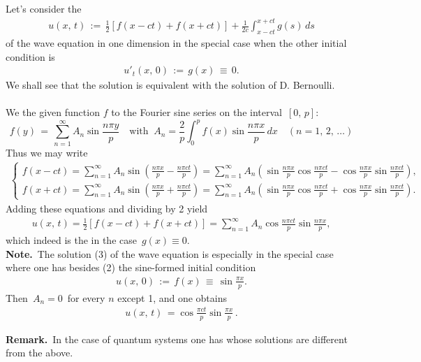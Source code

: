 \documentclass[12pt]{article}
\theoremstyle{definition}
\begin{document}
Let's consider the 
\begin{align}
u(x,\,t) \,:=\, \frac{1}{2}[f(x\!-\!ct)+f(x\!+\!ct)]+\frac{1}{2c}\int_{x-ct}^{x+ct}g(s)\,ds
\end{align}
of the wave equation in one dimension in the special case when the other initial condition is
\begin{align}
u'_t(x,\,0) \,:=\, g(x) \,\equiv\, 0.
\end{align}
We shall see that the solution is equivalent with the solution of D. Bernoulli.\\ \\

We  the given function $f$ to the Fourier sine series on the interval \,$[0,\,p]$:
$$
f(y) \,=\, \sum_{n=1}^\infty A_n\sin\frac{n\pi y}{p} \quad \mbox{with}\;\; 
A_n = \frac{2}{p}\int_0^pf(x)\sin\frac{n\pi x}{p}\,dx \quad (n = 1,\,2,\,\ldots)
$$
Thus we may write
\begin{align*}
\begin{cases}
   f(x\!-\!ct) = \sum_{n=1}^\infty A_n\sin\!\left(\frac{n\pi x}{p}-\frac{n\pi ct}{p}\right)= 
\sum_{n=1}^\infty A_n\left(\sin\frac{n\pi x}{p}\cos\frac{n\pi ct}{p}-\cos\frac{n\pi x}{p}\sin\frac{n\pi ct}{p}\right),
\\ f(x\!+\!ct) = \sum_{n=1}^\infty A_n\sin\!\left(\frac{n\pi x}{p}+\frac{n\pi ct}{p}\right)= 
\sum_{n=1}^\infty A_n\left(\sin\frac{n\pi x}{p}\cos\frac{n\pi ct}{p}+\cos\frac{n\pi x}{p}\sin\frac{n\pi ct}{p}\right). 
\end{cases}
\end{align*}
Adding these equations and dividing by 2 yield
\begin{align}
u(x,\,t) = \frac{1}{2}[f(x\!-\!ct)+f(x\!+\!ct)] 
= \sum_{n=1}^\infty A_n\cos\frac{n\pi ct}{p}\sin\frac{n\pi x}{p},
\end{align}
which indeed is the  in the case\, $g(x) \equiv 0$.\\

\textbf{Note.}\, The solution (3) of the wave equation is especially  in the special case where one has besides (2) the sine-formed initial condition
\begin{align}
u(x,\,0) \,:=\, f(x) \,\equiv\, \sin\frac{\pi x}{p}.
\end{align}
Then \,$A_n = 0$\, for every $n$ except 1, and one obtains
\begin{align}
u(x,\,t) \,= \cos\frac{\pi ct}{p}\sin\frac{\pi x}{p}\,.
\end{align}

\textbf{Remark.}\, 
In the case of quantum systems one has 
whose solutions are different from the above. 
\end{document}
